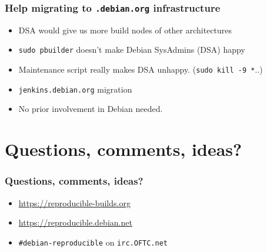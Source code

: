 \documentclass[14pt,aspectratio=169]{beamer}
\begin{document}
\begin{frame}
 \frametitle{Help migrating to \texttt{.debian.org} infrastructure}

 \begin{itemize}
  \item DSA would give us more build nodes of other architectures
  \item \texttt{sudo pbuilder} doesn't make Debian SysAdmins (DSA) happy
  \item Maintenance script really makes DSA unhappy. (\texttt{sudo kill -9 *}..)
  \item<2-3> \texttt{jenkins.debian.org} migration
  \item<3> No prior involvement in Debian needed.
 \end{itemize}
\end{frame}

\section{Questions, comments, ideas?}


\begin{frame}
 \frametitle{Questions, comments, ideas?}

 \begin{itemize}
  \item \url{https://reproducible-builds.org}
  \item \url{https://reproducible.debian.net}
  \item \texttt{\#debian-reproducible} on \texttt{irc.OFTC.net}
 \end{itemize}
\end{frame}
\end{document}
